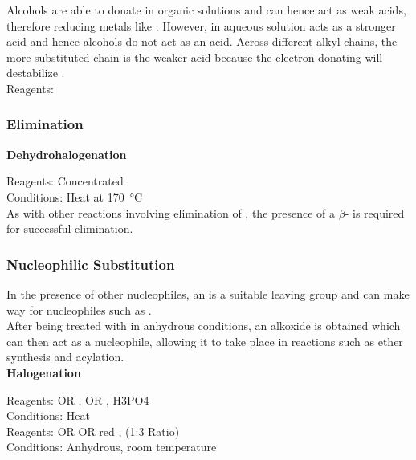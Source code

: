 \documentclass[../main]{subfiles}
\begin{document}
	Alcohols are able to donate  in organic solutions and can hence act as weak acids, therefore reducing metals like . However, in aqueous solution  acts as a stronger acid and hence alcohols do not act as an acid. Across different alkyl chains, the more substituted chain is the weaker acid because the electron-donating  will destabilize . \\

	Reagents:  \\


	\subsubsection{Elimination}

	\noindent \textbf{Dehydrohalogenation}

	Reagents: Concentrated  \\
	Conditions: Heat at \SI{170}{\celsius}\\

	As with other reactions involving elimination of , the presence of a \(\beta\)- is required for successful elimination. \\

	\subsubsection{Nucleophilic Substitution}

	In the presence of other nucleophiles, an  is a suitable leaving group and can make way for nucleophiles such as . \\

	After being treated with  in anhydrous conditions, an alkoxide  is obtained which can then act as a nucleophile, allowing it to take place in reactions such as ether synthesis and acylation. \\

	\noindent \textbf{Halogenation}

	Reagents:  OR ,  OR , {H3PO4} \\
	Conditions:  Heat \\

	Reagents:  OR  OR red ,  (1:3 Ratio) \\
	Conditions:  Anhydrous, room temperature \\
\end{document}
